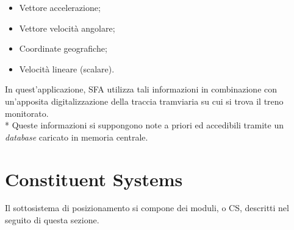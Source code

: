 \begin{itemize}
	\item Vettore accelerazione;
	\item Vettore velocit\`a angolare;
	\item Coordinate geografiche;
	\item Velocit\`a lineare (scalare).
\end{itemize}
In quest'applicazione, SFA utilizza tali informazioni in combinazione con un'apposita digitalizzazione della traccia tramviaria su cui si trova il treno monitorato.\cite{sfaimugps}\cite{sfaimuodo}\cite{sfaimuodogps} \\* Queste informazioni si suppongono note a priori ed accedibili tramite un \emph{database} caricato in memoria centrale. \cite{sqlite3}
\section{Constituent Systems}
Il sottosistema di posizionamento si compone dei moduli, o CS, descritti nel seguito di questa sezione.
